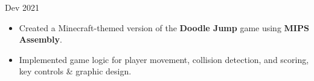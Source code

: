 \documentclass[10pt,a4paper,ragged2e,withhyper]{altacv}
\begin{document}
\begin{paracol}{2}
\begin{itemize}
    \end{itemize}

    \vspace{-5pt}
    \divider{}
    {Dev 2021 }{}
    \begin{itemize}
        \item Created a Minecraft-themed version of the \textbf{Doodle Jump} game using \textbf{MIPS Assembly}.
        \item Implemented game logic for player movement, collision detection, and scoring, key controls \& graphic design.
    \end{itemize}










\end{paracol}
\end{document}
